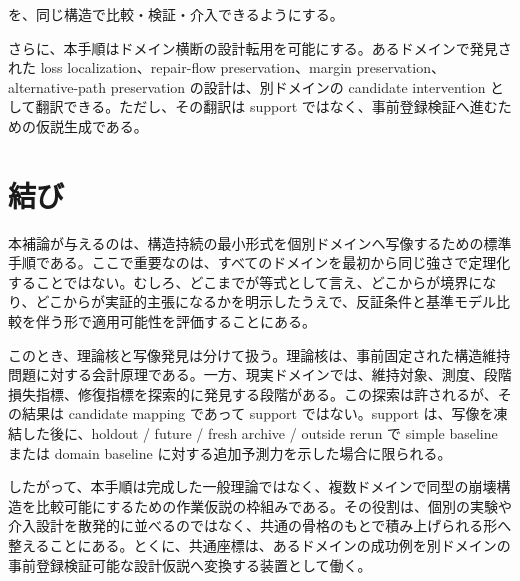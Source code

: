 \documentclass[12pt,a4paper]{article}
\begin{document}
を、同じ構造で比較・検証・介入できるようにする。

さらに、本手順はドメイン横断の設計転用を可能にする。あるドメインで発見された loss localization、repair-flow preservation、margin preservation、alternative-path preservation の設計は、別ドメインの candidate intervention として翻訳できる。ただし、その翻訳は support ではなく、事前登録検証へ進むための仮説生成である。

\section{結び}\label{ux7d50ux3073}

本補論が与えるのは、構造持続の最小形式を個別ドメインへ写像するための標準手順である。ここで重要なのは、すべてのドメインを最初から同じ強さで定理化することではない。むしろ、どこまでが等式として言え、どこからが境界になり、どこからが実証的主張になるかを明示したうえで、反証条件と基準モデル比較を伴う形で適用可能性を評価することにある。

このとき、理論核と写像発見は分けて扱う。理論核は、事前固定された構造維持問題に対する会計原理である。一方、現実ドメインでは、維持対象、測度、段階損失指標、修復指標を探索的に発見する段階がある。この探索は許されるが、その結果は candidate mapping であって support ではない。support は、写像を凍結した後に、holdout / future / fresh archive / outside rerun で simple baseline または domain baseline に対する追加予測力を示した場合に限られる。

したがって、本手順は完成した一般理論ではなく、複数ドメインで同型の崩壊構造を比較可能にするための作業仮説の枠組みである。その役割は、個別の実験や介入設計を散発的に並べるのではなく、共通の骨格のもとで積み上げられる形へ整えることにある。とくに、共通座標は、あるドメインの成功例を別ドメインの事前登録検証可能な設計仮説へ変換する装置として働く。
\end{document}
